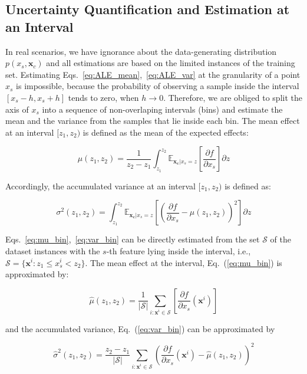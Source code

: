 \documentclass[twoside]{article}
\newcommand{\dfdx}{\frac{\partial f}{\partial x_s}}
\newcommand{\xc}{\mathbf{x_c}}
\begin{document}
\subsection{Uncertainty Quantification and Estimation at an Interval}

In real scenarios, we have ignorance about the data-generating
distribution \(p(x_s, \mathbf{x}_c)\) and all estimations are based on
the limited instances of the training set. Estimating
Eqs.~\eqref{eq:ALE_mean},~\eqref{eq:ALE_var} at the granularity of a
point \(x_s\) is impossible, because the probability of observing a
sample inside the interval \([x_s - h, x_s + h]\) tends to zero, when
\(h \to 0\). Therefore, we are obliged to split the axis of \(x_s\)
into a sequence of non-overlaping intervals (bins) and estimate the
mean and the variance from the samples that lie inside each bin. The
mean effect at an interval \([z_1, z_2)\) is defined as the mean of
the expected effects:

\begin{equation}
  \label{eq:mu_bin}
  \mu(z_1, z_2) = \frac{1}{z_2 - z_1} \int_{z_1}^{z_2}
  \mathbb{E}_{\xc|x_s=z}\left [\frac{\partial f}{\partial x_s} \right ] \partial z
\end{equation}

\noindent
Accordingly, the accumulated variance at an interval \([z_1, z_2)\)
is defined as:

\begin{equation}
  \label{eq:var_bin}
  \sigma^2(z_1, z_2) = \int_{z_1}^{z_2}
  \mathbb{E}_{\xc|x_s=z} \left [ (\frac{\partial
      f}{\partial x_s} - \mu(z_1, z_2) )^2 \right] \partial z
\end{equation}

Eqs.~\eqref{eq:mu_bin},~\eqref{eq:var_bin} can be directly estimated
from the set \(\mathcal{S}\) of the dataset instances with the
\(s\)-th feature lying inside the interval, i.e.,
\( \mathcal{S}= \{ \mathbf{x}^i : z_1 \leq x^i_s < z_2 \} \). The mean
effect at the interval, Eq.~(\ref{eq:mu_bin}) is approximated by:

\begin{equation}
  \label{eq:mean_estimation}
  \hat{\mu}(z_1, z_2) = \frac{1}{|\mathcal{S}|} \sum_{i:\mathbf{x}^i \in
    \mathcal{S}} \left [ \dfdx(\mathbf{x}^i) \right ]
\end{equation}

and the accumulated variance, Eq.~(\ref{eq:var_bin}) can be
approximated by

\begin{equation}
  \label{eq:variance_estimation}
  \hat{\sigma}^2(z_1, z_2) = \frac{z_2 - z_1}{|\mathcal{S}|} \sum_{i:\mathbf{x}^i \in
    \mathcal{S}} \left ( \dfdx(\mathbf{x}^i) - \hat{\mu}(z_1, z_2) \right )^2
\end{equation}
\end{document}
